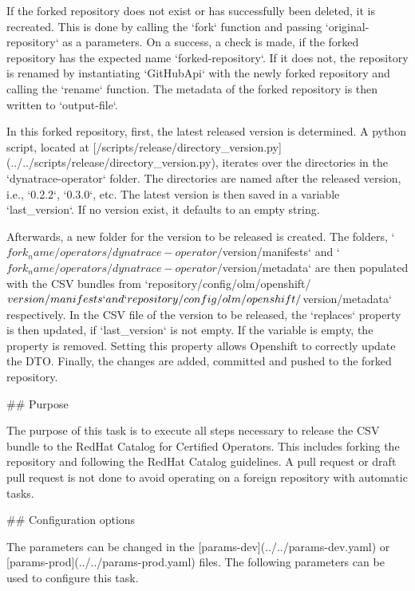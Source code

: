 If the forked repository does not exist or has successfully been deleted, it is recreated.
This is done by calling the `fork` function and passing `{original-repository}` as a parameters.
On a success, a check is made, if the forked repository has the expected name `{forked-repository}`.
If it does not, the repository is renamed by instantiating `GitHubApi` with the newly forked repository and calling the `rename` function.
The metadata of the forked repository is then written to `{output-file}`.

In this forked repository, first, the latest released version is determined.
A python script, located at [/scripts/release/directory_version.py](../../scripts/release/directory_version.py), iterates over the directories in the `dynatrace-operator` folder.
The directories are named after the released version, i.e., `0.2.2`, `0.3.0`, etc.
The latest version is then saved in a variable `last_version`.
If no version exist, it defaults to an empty string.

Afterwards, a new folder for the version to be released is created.
The folders, `${fork_name}/operators/dynatrace-operator/${version}/manifests` and `${fork_name}/operators/dynatrace-operator/${version}/metadata` are then populated with the CSV bundles from `{repository}/config/olm/openshift/${version}/manifests` and `{repository}/config/olm/openshift/${version}/metadata` respectively.
In the CSV file of the version to be released, the `replaces` property is then updated, if `last_version` is not empty.
If the variable is empty, the property is removed.
Setting this property allows Openshift to correctly update the DTO.
Finally, the changes are added, committed and pushed to the forked repository.

## Purpose

The purpose of this task is to execute all steps necessary to release the CSV bundle to the RedHat Catalog for Certified Operators.
This includes forking the repository and following the RedHat Catalog guidelines.
A pull request or draft pull request is not done to avoid operating on a foreign repository with automatic tasks.

## Configuration options

The parameters can be changed in the [params-dev](../../params-dev.yaml) or [params-prod](../../params-prod.yaml) files.
The following parameters can be used to configure this task.

